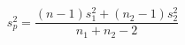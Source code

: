 \documentclass[10pt]{article}
\begin{document}
\[s_p^2 = \frac{(n-1)s_1^2+(n_2-1)s_2^2}{n_1+n_2-2}
\]
\end{document}
